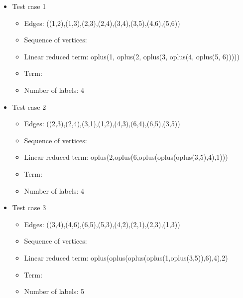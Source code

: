 \documentclass[a4paper, 12pt]{article}
\begin{document}
\begin{itemize}

\item Test case 1
	\begin{itemize}
		\item Edges: ((1,2),(1,3),(2,3),(2,4),(3,4),(3,5),(4,6),(5,6))
		\item Sequence of vertices: 
		\item Linear reduced term: oplus(1, oplus(2, oplus(3, oplus(4, oplus(5, 6)))))
		\item Term: 
		\item Number of labels: 4
	\end{itemize}

\item Test case 2
	\begin{itemize}
		\item Edges: ((2,3),(2,4),(3,1),(1,2),(4,3),(6,4),(6,5),(3,5))
		\item Sequence of vertices: 
		\item Linear reduced term: oplus(2,oplus(6,oplus(oplus(oplus(3,5),4),1)))
		\item Term: 
		\item Number of labels: 4
	\end{itemize}

\item Test case 3
	\begin{itemize}
		\item Edges: ((3,4),(4,6),(6,5),(5,3),(4,2),(2,1),(2,3),(1,3))
		\item Sequence of vertices: 
		\item Linear reduced term: oplus(oplus(oplus(oplus(1,oplus(3,5)),6),4),2)
		\item Term: 
		\item Number of labels: 5
	\end{itemize}


\end{itemize}
\end{document}
